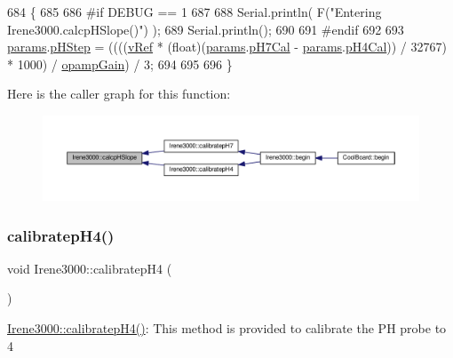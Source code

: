 \begin{DoxyCode}
684 \{
685 
686 \textcolor{preprocessor}{#if DEBUG == 1 }
687 
688     Serial.println( F(\textcolor{stringliteral}{"Entering Irene3000.calcpHSlope()"}) );
689     Serial.println();
690 
691 \textcolor{preprocessor}{#endif }
692 
693     \hyperlink{class_irene3000_a136585a5ee7f9ac6ab52175fa153f8e3}{params}.\hyperlink{struct_irene3000_1_1parameters___t_a61cfcc2539d5f630e9071f3753aba9fe}{pHStep} = ((((\hyperlink{class_irene3000_a018e7ff9bee57e6d2b298667a668ba7e}{vRef} * (float)(\hyperlink{class_irene3000_a136585a5ee7f9ac6ab52175fa153f8e3}{params}.\hyperlink{struct_irene3000_1_1parameters___t_a21265466a570d84bff914f26d2f7a03e}{pH7Cal} - 
      \hyperlink{class_irene3000_a136585a5ee7f9ac6ab52175fa153f8e3}{params}.\hyperlink{struct_irene3000_1_1parameters___t_a1144de6fb54eb3e1dd2a3d8c2afc97dc}{pH4Cal})) / 32767) * 1000) / \hyperlink{class_irene3000_a4e588985ca74e5076029d5dee81034f2}{opampGain}) / 3;
694 
695  
696 \}
\end{DoxyCode}
Here is the caller graph for this function\+:\nopagebreak
\begin{figure}[H]
\begin{center}
\leavevmode
\includegraphics[width=350pt]{d6/d03/class_irene3000_a81f6a79e546679692053f7ac1af49613_icgraph}
\end{center}
\end{figure}
\mbox{\label{class_irene3000_aa140dd026922a04981edfd04d46cabbe}} 
\subsubsection{\texorpdfstring{calibratep\+H4()}{calibratepH4()}}
{\footnotesize\ttfamily void Irene3000\+::calibratep\+H4 (\begin{DoxyParamCaption}{ }\end{DoxyParamCaption})}

\hyperlink{class_irene3000_aa140dd026922a04981edfd04d46cabbe}{Irene3000\+::calibratep\+H4()}\+: This method is provided to calibrate the PH probe to 4 

